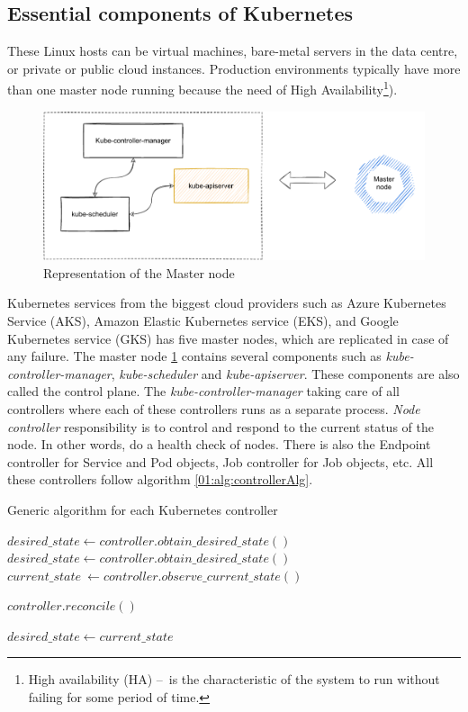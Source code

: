 \subsection{Essential components of Kubernetes}
These Linux hosts can be virtual machines, bare-metal servers in the data centre, or private or public cloud instances. Production environments typically have more than one master node running because the need of High Availability\footnote{High availability (HA) \---\ is the characteristic of the system to run without failing for some period of time.}). 
\begin{figure}[!h]
    \centering
    \includegraphics[scale=0.82]{obrazky-figures/02-preliminaries/01-kubernetes/02-architecture-master-sketch.pdf}
    \caption{Representation of the Master node}
    \label{02:fig:masterNode}
\end{figure}
Kubernetes services from the biggest cloud providers such as Azure Kubernetes Service (AKS), Amazon Elastic Kubernetes service (EKS), and Google Kubernetes service (GKS) has five master nodes, which are replicated in case of any failure. The master node \ref{02:fig:masterNode} contains several components such as \emph{kube-controller-manager}, \emph{kube-scheduler} and \emph{kube-apiserver}. These components are also called the control plane. The \emph{kube-controller-manager} taking care of all controllers where each of these controllers runs as a separate process. \emph{Node controller} responsibility is to control and respond to the current status of the node. In other words, do a health check of nodes. There is also the Endpoint controller for Service and Pod objects, Job controller for Job objects, etc. All these controllers follow algorithm \ref{01:alg:controllerAlg}.
\begin{algorithm}[H]
\label{01:alg:controllerAlg}
\caption{Generic algorithm for each Kubernetes controller}

    \begin{algorithmic}[1]
        \State $desired\_state \gets controller.obtain\_desired\_state()$
            \State $desired\_state \gets controller.obtain\_desired\_state()$
            \State $current\_state\ \gets controller.observe\_current\_state()$
            
                \State $controller.reconcile()$
            \EndIf
    
           \State $desired\_state \gets current\_state$
        \EndWhile
    \end{algorithmic}
\end{algorithm}
